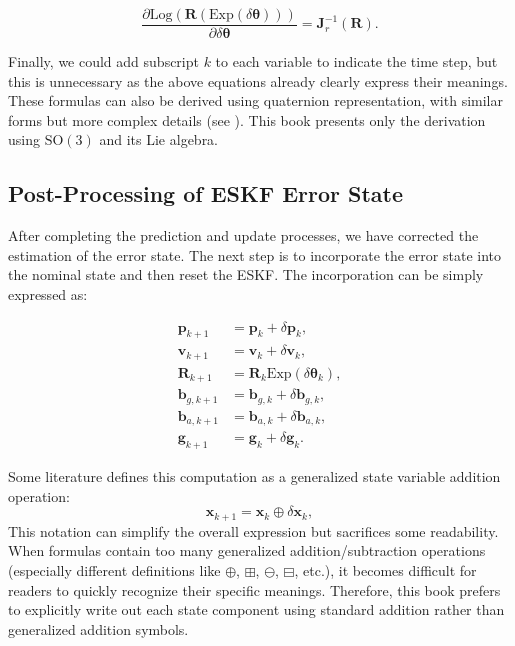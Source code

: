 \begin{equation}\label{eq:rotation-derivative}
	\frac{\partial \mathrm{Log} (\bm{R}(\mathrm{Exp}(\delta \boldsymbol{\theta})))}{\partial \delta \boldsymbol{\theta}} = \bm{J}_r^{-1} (\bm{R}).
\end{equation}

Finally, we could add subscript $k$ to each variable to indicate the time step, but this is unnecessary as the above equations already clearly express their meanings. These formulas can also be derived using quaternion representation, with similar forms but more complex details (see \cite{Sola2017}). This book presents only the derivation using $\mathrm{SO}(3)$ and its Lie algebra.
\subsection{Post-Processing of ESKF Error State}
After completing the prediction and update processes, we have corrected the estimation of the error state. The next step is to incorporate the error state into the nominal state and then reset the ESKF. The incorporation can be simply expressed as:

\begin{subequations}\label{eq:error-state-incorporation}
	\begin{align}
		\bm{p}_{k+1} &= \bm{p}_k + \delta \bm{p}_k, \\
		\bm{v}_{k+1} &= \bm{v}_k + \delta \bm{v}_k, \\
		\bm{R}_{k+1} &= \bm{R}_k \mathrm{Exp}(\delta \boldsymbol{\theta}_k), \\
		\bm{b}_{g, k+1} &= \bm{b}_{g,k} + \delta \bm{b}_{g,k}, \\
		\bm{b}_{a, k+1} &= \bm{b}_{a,k} + \delta \bm{b}_{a,k}, \\
		\bm{g}_{k+1} &= \bm{g}_{k} + \delta \bm{g}_{k}.
	\end{align}
\end{subequations}

Some literature defines this computation as a generalized state variable addition operation:
\begin{equation}\label{eq:generalized-addition}
	\bm{x}_{k+1} = \bm{x}_k \oplus \delta \bm{x}_{k},
\end{equation}
This notation can simplify the overall expression but sacrifices some readability. When formulas contain too many generalized addition/subtraction operations (especially different definitions like $\oplus$, $\boxplus$, $\ominus$, $\boxminus$, etc.), it becomes difficult for readers to quickly recognize their specific meanings. Therefore, this book prefers to explicitly write out each state component using standard addition rather than generalized addition symbols.

